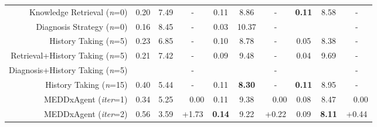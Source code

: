 \begin{table*}[ht]
\begin{tabular}{rccccccccc}
Knowledge Retrieval  (\textit{n}=0)     &     0.20       &  7.49  &  -  &   0.11      &  8.86       & -  &     \textbf{0.11}     &  8.58  &    -   \\
Diagnosis Strategy  (\textit{n}=0)   &       0.16         &       8.45     &       -      &      0.03          &      10.37        &          -      &              &             &           -      \\
History Taking (\textit{n}=5)         & 0.23           & 6.85    & -  & 0.10        & 8.78        &  - & 0.05         & 8.38       &   - \\
Retrieval+History Taking (\textit{n}=5)  &      0.21      & 7.42   &  -  &  0.09  &  9.48       & -  &     0.04   &   9.69 &    -   \\
Diagnosis+History Taking (\textit{n}=5)  &           &   &  -  &   &       & -  &       &    &    -   \\
History Taking (\textit{n}=15)        & 0.40           & 5.44   &  -  & 0.11        & \textbf{8.30}       &  -  & \textbf{0.11}        & 8.95       &  -  \\\cmidrule(lr){2-10}
MEDDxAgent (\textit{iter}=1)                       & 0.34           & 5.25   &   ~~0.00 & 0.11        & 9.38       &  ~~0.00  & 0.08         & 8.47    &    ~~0.00   \\
MEDDxAgent (\textit{iter}=2)                       & 0.56           & 3.59    & +1.73  & \textbf{0.14}        & 9.22       &  +0.22  & 0.09         & \textbf{8.11}      &  +0.44   \\

\end{tabular}
\end{table*}
